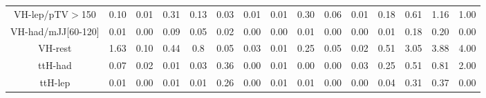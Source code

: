 \begin{table}[htb]
\begin{center}
{\begin{tabular}{cccccccc|cccc|cc|c}
\\
VH-lep/pTV$>$150 & 0.10 & 0.01 & 0.31 & 0.13 & 0.03 & 0.01 & 0.01 & 0.30 & 0.06 & 0.01 & 0.18 & 0.61 & 1.16 & 1.00
\\
VH-had/mJJ[60-120] & 0.01 & 0.00 & 0.09 & 0.05 & 0.02 & 0.00 & 0.00 & 0.01 & 0.00 & 0.00 & 0.01 & 0.18 & 0.20 & 0.00
\\
VH-rest & 1.63 & 0.10 & 0.44 & 0.8 & 0.05 & 0.03 & 0.01 & 0.25 & 0.05 & 0.02 & 0.51 & 3.05 & 3.88 & 4.00
\\
ttH-had & 0.07 & 0.02 & 0.01 & 0.03 & 0.36 & 0.00 & 0.01 & 0.00 & 0.00 & 0.03 & 0.25 & 0.51 & 0.81 & 2.00
\\
ttH-lep & 0.01 & 0.00 & 0.01 & 0.01 & 0.26 & 0.00 & 0.01 & 0.01 & 0.00 & 0.00 & 0.04 & 0.31 & 0.37 & 0.00
\\
	\hline
				\hline
		\end{tabular}}
	\end{center}
\end{table}

\clearpage